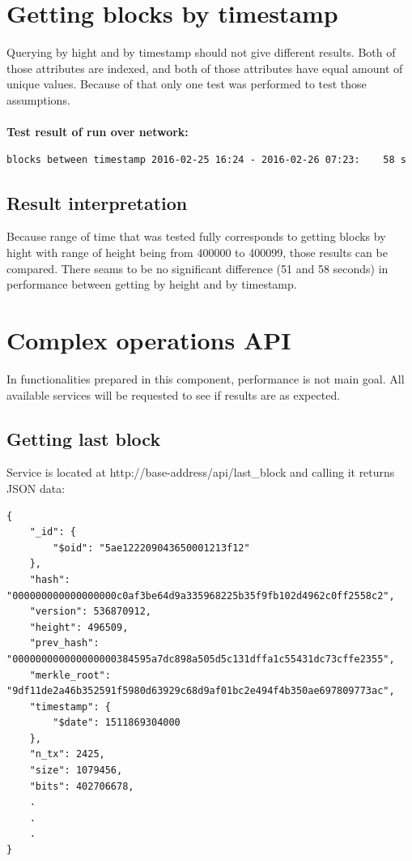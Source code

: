 \documentclass[12pt, en, eng, oneside]{mgr}
\begin{document}
\section{Getting blocks by timestamp}
Querying by hight and by timestamp should not give different results. Both of those attributes are indexed, and both of those attributes have equal amount of unique values. Because of that only one test was performed to test those assumptions.
\\
\\
\textbf{Test result of run over network:}
\begin{verbatim}
blocks between timestamp 2016-02-25 16:24 - 2016-02-26 07:23:    58 s
\end{verbatim}

\subsection{Result interpretation}
Because range of time that was tested fully corresponds to getting blocks by hight with range of height being from 400000 to 400099, those results can be compared. There seams to be no significant difference (51 and 58 seconds) in performance between getting by height and by timestamp.

\section{Complex operations API}
In functionalities prepared in this component, performance is not main goal. All available services will be requested to see if results are as expected.

\subsection{Getting last block}
Service is located at http://base-address/api/last\_block and calling it returns JSON data:
\begin{verbatim}
{
    "_id": {
        "$oid": "5ae122209043650001213f12"
    },
    "hash": "000000000000000000c0af3be64d9a335968225b35f9fb102d4962c0ff2558c2",
    "version": 536870912,
    "height": 496509,
    "prev_hash": "000000000000000000384595a7dc898a505d5c131dffa1c55431dc73cffe2355",
    "merkle_root": "9df11de2a46b352591f5980d63929c68d9af01bc2e494f4b350ae697809773ac",
    "timestamp": {
        "$date": 1511869304000
    },
    "n_tx": 2425,
    "size": 1079456,
    "bits": 402706678,
    .
    .
    .
}
\end{verbatim}
\end{document}

